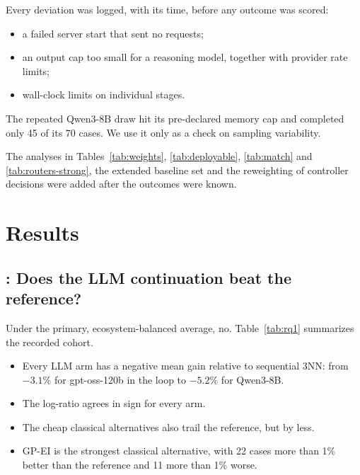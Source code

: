 Every deviation was logged, with its time, before any outcome was scored:
\begin{itemize}
  \item a failed server start that sent no requests;
  \item an output cap too small for a reasoning model, together with provider rate limits;
  \item wall-clock limits on individual stages.
\end{itemize}
The repeated Qwen3-8B draw hit its pre-declared memory cap and completed only 45 of its 70 cases. We use it only as a check on sampling variability.

The analyses in Tables~\ref{tab:weights}, \ref{tab:deployable}, \ref{tab:match} and \ref{tab:routers-strong}, the extended baseline set and the reweighting of controller decisions were added after the outcomes were known.

\section{Results}

\subsection{: Does the LLM continuation beat the reference?}
\label{sec:rq1}

Under the primary, ecosystem-balanced average, no. Table~\ref{tab:rq1} summarizes the recorded cohort.
\begin{itemize}
  \item Every LLM arm has a negative mean gain relative to sequential 3NN: from $-3.1\%$ for gpt-oss-120b in the loop to $-5.2\%$ for Qwen3-8B.
  \item The log-ratio agrees in sign for every arm.
  \item The cheap classical alternatives also trail the reference, but by less.
  \item GP-EI is the strongest classical alternative, with 22 cases more than 1\% better than the reference and 11 more than 1\% worse.
\end{itemize}

